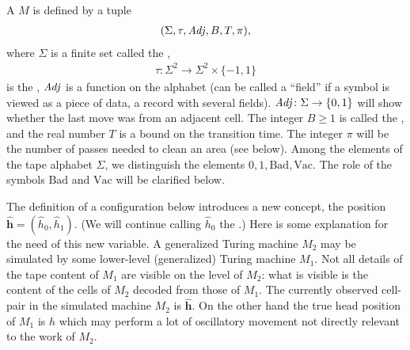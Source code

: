 \documentclass[11pt]{memoir}
\theoremstyle{definition} %
\renewcommand{\ge}{\geq}
\renewcommand{\vek}[1]{\mathbf{#1}}
\newcommand{\fld}[1]{\ensuremath{\textit{#1\/}}}
\def\B{B}
\newcommand{\Bad}{\mathrm{Bad}}
\newcommand{\Vacant}{\mathrm{Vac}}
\newcommand{\h}{h}
\newcommand{\hc}{\hat h}
\newcommand{\vhc}{\vek{\hat h}}
\newcommand{\passno}{\pi}
\newcommand{\Tu}{T}
\newcommand{\cDir}{\fld{cDir}}
\newcommand{\Adj}{\fld{Adj}}
\begin{document}
\begin{definition}\label{def:gen-TM}
    A  \( M \) is defined by a tuple
        \begin{align}\label{eq:gen-TM}
             (\Sigma, \tau, \Adj,\B, \Tu, \passno),
       \end{align}
    where \( \Sigma \) is a finite set called the ,
        \begin{align*}
             \tau: \Sigma^{2}\to \Sigma^{2}\times\{-1,1\}
        \end{align*}
    is the ,
\( \Adj \) is a function on the alphabet (can be called a ``field'' if a symbol is viewed 
as a piece of data, a record with several fields).
\( \Adj\colon\Sigma\to\{ 0, 1 \} \) will show 
whether the last move was from an adjacent cell.
The integer \( \B\ge 1 \) is called the ,
and the real number \( \Tu \) is a bound on the transition time.
The integer \( \passno \) will be the number of passes needed to clean an area (see below).
Among the elements of the tape alphabet \( \Sigma \), 
we distinguish the elements \( 0,1,\Bad,\Vacant \).
The role of the symbols \( \Bad \) and \( \Vacant \) will be clarified below.
\end{definition}

The definition of a configuration below introduces a new concept, the  position
\( \vhc = (\hc_{0},\hc_{1}) \).
(We will continue calling \( \hc_{0} \) the .)
Here is some explanation for the need of this new variable.
A generalized Turing machine \( M_{2} \) may be simulated by some lower-level (generalized) Turing
machine \( M_{1} \).
Not all details of the tape content of \( M_{1} \) are visible on the level of \( M_{2} \): what is visible
is the content of the cells of \( M_{2} \) decoded from those of \( M_{1} \).
The currently observed cell-pair in the simulated machine \( M_{2} \) is \( \vhc \).
On the other hand the true head position of \( M_{1} \) is \( \h \)
which may perform a lot of oscillatory movement
not directly relevant to the work of \( M_{2} \).
\end{document}
